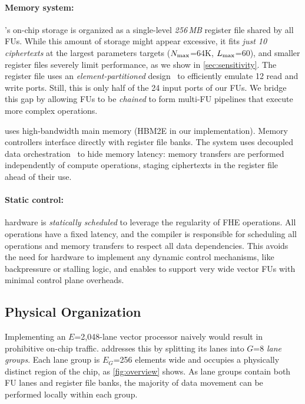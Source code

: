 \paragraph{Memory system:}
\name's on-chip storage is organized as a single-level \emph{256\,MB} register
file shared by all FUs.
While this amount of storage might appear excessive, it fits \emph{just 10
ciphertexts} at the largest parameters \name targets ($N_{\textrm{max}}$=64K, $L_{\textrm{max}}$=60),
and smaller register files severely limit performance, as we show in
\autoref{sec:sensitivity}.
The register file uses an \emph{element-partitioned}
design~\cite{asanovic:ucb98:vector} to efficiently emulate 12 read and write
ports.
Still, this is only half of the 24 input ports of our FUs.
We bridge this gap by allowing FUs to be \emph{chained} to form multi-FU pipelines
that execute more complex operations.

\name uses high-bandwidth main memory (HBM2E in our implementation).
Memory controllers interface directly with register file banks.
The system uses decoupled data orchestration~\cite{pellauer:asplos19:buffets} to hide memory latency:
memory transfers are performed independently of compute operations,
staging ciphertexts in the register file ahead of their use.


\paragraph{Static control:}
\name hardware is \emph{statically scheduled} to leverage the regularity of FHE operations.
All operations have a fixed latency, and the compiler is responsible for scheduling
all operations and memory transfers to respect all data dependencies.
This avoids the need for hardware to implement any dynamic control
mechanisms, like backpressure or stalling logic, and enables \name to support
very wide vector FUs with minimal control plane overheads.

\subsection{Physical Organization}
\label{sec:tiling}
Implementing an $E$=2,048-lane vector processor naively would result in
prohibitive on-chip traffic.
\name addresses this by splitting its lanes into $G$=8 \emph{lane groups}.
Each lane group is $E_G$=256 elements wide and occupies a physically distinct region
of the chip, as \autoref{fig:overview} shows.
As lane groups contain both FU lanes and register file banks, the majority of
data movement can be performed locally within each group.


